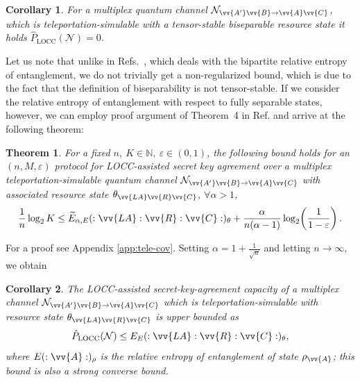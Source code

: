 \documentclass[aps,pra,twocolumn,superscriptaddress,longbibliography]{revtex4-1}
\def\LOCC{\operatorname{LOCC}}
\def\({\left(}
\def\){\right)}
\newcommand{\mc}[1]{\mathcal{#1}}
\newtheorem{theorem}{Theorem}
\newtheorem{corollary}{Corollary}
\begin{document}
\begin{corollary}
For a multiplex quantum channel $\mc{N}_{\vv{A'}\vv{B}\to\vv{A}\vv{C}}$, which is teleportation-simulable with a tensor-stable biseparable resource state it holds $\hat{P}_{\LOCC}(\mc{N})=0$.
\end{corollary}

Let us note that unlike in Refs.~\cite{PLOB15,HHHO09}, which deals with the bipartite relative entropy of entanglement, we do not trivially get a non-regularized bound, which is due to the fact that the definition of biseparability is not tensor-stable. If we consider the relative entropy of entanglement with respect to fully separable states, however, we can employ proof argument of Theorem~4 in Ref. \cite{DBW17} and arrive at the following theorem:

\begin{theorem}\label{theo:E-alpha_bound}
For a fixed $n,\ K\in\mathbb{N},\ \varepsilon\in(0,1)$, the following bound holds for an $(n,M,\varepsilon)$ protocol for LOCC-assisted secret key agreement over a multiplex teleportation-simulable quantum channel $\mc{N}_{\vv{A'}\vv{B}\to\vv{A}\vv{C}}$ with associated resource state $\theta_{\vv{LA}\vv{R}\vv{C}}$,  $\forall \alpha>1$,
\begin{equation}\label{eq:GE-tele-weak-converse}
\frac{1}{n} \log_2 K \leq  \widetilde{E}_{\alpha,E} (:\vv{LA}:\vv{R}:\vv{C}:)_{\theta} 
+\frac{\alpha}{n(\alpha-1)}\log_2 \!\(
\frac{1}{1-\varepsilon}\).
\end{equation} 
\end{theorem}

For a proof see Appendix \ref{app:tele-cov}. Setting $\alpha=1+\frac{1}{\sqrt{n}}$ and letting $n\to\infty$, we obtain

\begin{corollary}\label{thm:tele}
The LOCC-assisted secret-key-agreement capacity of a multiplex channel $\mc{N}_{\vv{A'}\vv{B}\to\vv{A}\vv{C}}$ which is teleportation-simulable with resource state $\theta_{\vv{LA}\vv{R}\vv{C}}$ is upper bounded as 
\begin{equation}\label{eq:tele-bound}
\hat{P}_{\LOCC}(\mc{N})\leq E_E(:\vv{LA}:\vv{R}:\vv{C}:)_{\theta}, 
\end{equation}
where $E(:\vv{A}:)_{\rho}$ is the relative entropy of entanglement of state $\rho_{\vv{A}}$; this bound is also a strong converse bound. 
\end{corollary}
   


\end{document}
